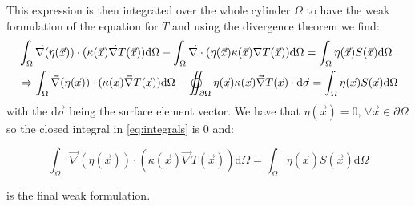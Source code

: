 This expression is then integrated over the whole cylinder $\Omega$ to have the weak formulation of the equation for $T$ and using the divergence theorem we find:
\begin{equation}
    \begin{aligned}
        & \int_\Omega \vec{\nabla}(\eta(\vec{x}))\cdot(\kappa(\vec{x})\vec{\nabla}T(\vec{x})) \mathrm{d}\Omega - \int_\Omega \vec{\nabla}\cdot(\eta(\vec{x})\kappa(\vec{x})\vec{\nabla}T(\vec{x})) \mathrm{d}\Omega = \int_\Omega \eta(\vec{x})S(\vec{x}) \mathrm{d}\Omega \\
        & \Rightarrow \int_\Omega \vec{\nabla}(\eta(\vec{x}))\cdot(\kappa(\vec{x})\vec{\nabla}T(\vec{x})) \mathrm{d}\Omega - \varoiint_{\partial\Omega} \eta(\vec{x})\kappa(\vec{x})\vec{\nabla}T(\vec{x}) \cdot \mathrm{d}\vec{\sigma} = \int_\Omega \eta(\vec{x})S(\vec{x}) \mathrm{d}\Omega
    \end{aligned}
    \label{eq:integrals}
\end{equation}
with the $\mathrm{d}\vec{\sigma}$ being the surface element vector. We have that $\eta(\vec{x}) = 0, \, \forall \vec{x} \in \partial\Omega$ so the closed integral in \autoref{eq:integrals} is 0 and:

\begin{equation}
    \int_\Omega \vec{\nabla}(\eta(\vec{x}))\cdot(\kappa(\vec{x})\vec{\nabla}T(\vec{x})) \mathrm{d}\Omega = \int_\Omega \eta(\vec{x})S(\vec{x}) \mathrm{d}\Omega
    \label{eq:weak_formulation}
\end{equation}

is the final weak formulation.

